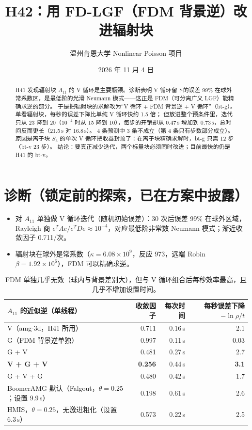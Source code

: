 \documentclass[11pt,a4paper]{ctexart}
\title{H42：用 FD-LGF（FDM 背景逆）改进辐射块}
\author{温州肯恩大学 \quad Nonlinear Poisson 项目}
\date{2026 年 11 月 4 日}
\begin{document}
\maketitle

\begin{abstract}
H41 发现辐射块 $A_{11}$ 的 V 循环是主要瓶颈。诊断表明 V 循环留下的误差 99\% 在球外常系数区，是最低阶的光滑 Neumann 模式——这正是 FDM（可分离广义 LGF）能精确求逆的部分。
于是把辐射块的求解改为“V 循环 + FDM 背景逆 + V 循环”（bt-g）。单看辐射块，每秒的误差下降比单纯 V 循环快约 1.5 倍；
但放进整个预条件里，迭代只从 23 降到 20（$10^{-4}$ 时从 15 降到 10），每步的开销却从 0.47\,s 增加到 0.73\,s，总时间反而更长（21.5\,s 对 16.8\,s）。
4 条预测中 3 条不成立（第 4 条只有步数部分成立）。原因是离子块 $S_3$ 的单次 V 循环把收益封顶了：在离子块精确求解时，bt-g 只需 12 步（bt-v 23 步）。
结论：要真正减少迭代，两个标量块必须同时改进；目前最快的仍是 H41 的 bt-v。
\end{abstract}

\section{诊断（锁定前的探索，已在方案中披露）}
\begin{itemize}
\item 对 $A_{11}$ 单独做 V 循环迭代（随机初始误差）：30 次后误差 99\% 在球外区域，Rayleigh 商 $e^TAe/e^TDe\approx10^{-4}$，对应最低阶非常数 Neumann 模式；渐近收敛因子 0.711/次。
\item 辐射块在球外是常系数（$\kappa=6.08\times10^{9}$，反应 973，远端 Robin $\beta=1.92\times10^{6}$），FDM 可以精确求逆。
\end{itemize}
\begin{table}[H]
\centering
\small
\begin{tabular}{lrrr}
\toprule
$A_{11}$ 的近似逆（单线程） & 收敛因子 & 每次时间 & 每秒误差下降 $-\ln\rho/t$ \\
\midrule
V（amg-3d，H41 所用） & 0.711 & 0.16\,s & 2.1 \\
G（FDM 背景逆单独） & 0.997 & 0.11\,s & 0.03 \\
G + V & 0.481 & 0.27\,s & 2.7 \\
\textbf{V + G + V} & \textbf{0.256} & 0.44\,s & \textbf{3.1} \\
G + V + G & 0.480 & 0.42\,s & 1.7 \\
BoomerAMG 默认（Falgout，$\theta=0.25$；设置 9.9\,s） & 0.198 & 0.61\,s & 2.6 \\
HMIS，$\theta=0.25$，无激进粗化（设置 6.3\,s） & 0.573 & 0.22\,s & 2.5 \\
\bottomrule
\end{tabular}
\caption{FDM 单独几乎无效（球内与背景差别大），但与 V 循环组合后每秒效率最高，且几乎不增加设置时间。}
\end{table}
\end{document}
